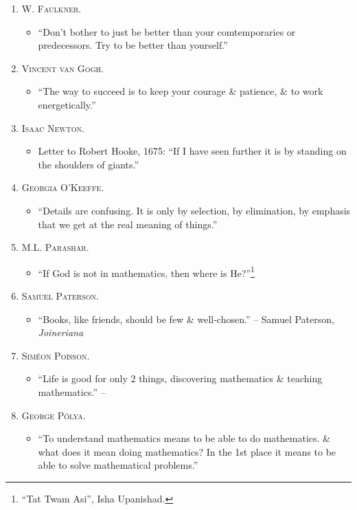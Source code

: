 \documentclass{article}
\begin{document}
\begin{enumerate}
	\item \textsc{W. Faulkner.}
	\begin{itemize}
		\item ``Don't bother to just be better than your comtemporaries or predecessors. Try to be better than yourself.''
	\end{itemize}
	\item \textsc{Vincent van Gogh.}
	\begin{itemize}
		\item ``The way to succeed is to keep your courage \& patience, \& to work energetically.''
	\end{itemize}
	\item \textsc{Isaac Newton.}
	\begin{itemize}
		\item Letter to Robert Hooke, 1675: ``If I have seen further it is by standing on the shoulders of giants.''
	\end{itemize}	
	\item \textsc{Georgia O'Keeffe.}
	\begin{itemize}
		\item ``Details are confusing. It is only by selection, by elimination, by emphasis that we get at the real meaning of things.''
	\end{itemize}
	\item \textsc{M.L. Parashar.}
	\begin{itemize}
		\item ``If God is not in mathematics, then where is He?''\footnote{``Tat Twam Asi'', Isha Upanishad.}
	\end{itemize}
	\item \textsc{Samuel Paterson.}
	\begin{itemize}
		\item ``Books, like friends, should be few \& well-chosen.'' -- Samuel Paterson, \textit{Joineriana}
	\end{itemize}
	\item \textsc{Sim\'eon Poisson.}
	\begin{itemize}
		\item ``Life is good for only 2 things, discovering mathematics \& teaching mathematics.'' -- \cite[p. v]{Gelca_Andreescu2017}
	\end{itemize}
	\item \textsc{George P\'olya.}
	\begin{itemize}
		\item ``To understand mathematics means to be able to do mathematics. \& what does it mean doing mathematics? In the 1st place it means to be able to solve mathematical problems.''

\end{itemize}
\end{enumerate}
\end{document}
